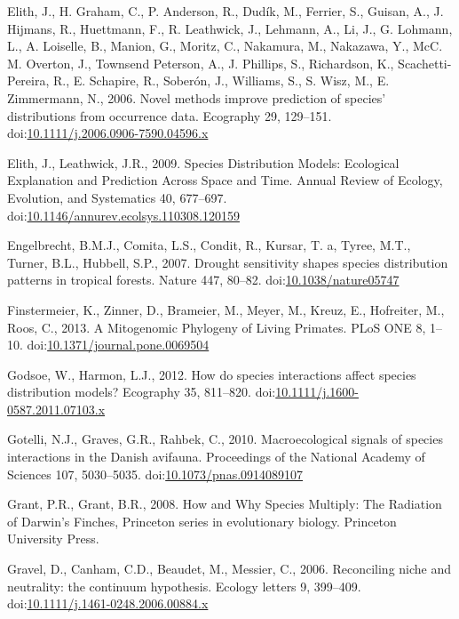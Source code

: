 \hypertarget{ref-Elith2006}{}
Elith, J., H. Graham, C., P. Anderson, R., Dudík, M., Ferrier, S.,
Guisan, A., J. Hijmans, R., Huettmann, F., R. Leathwick, J., Lehmann,
A., Li, J., G. Lohmann, L., A. Loiselle, B., Manion, G., Moritz, C.,
Nakamura, M., Nakazawa, Y., McC. M. Overton, J., Townsend Peterson, A.,
J. Phillips, S., Richardson, K., Scachetti-Pereira, R., E. Schapire, R.,
Soberón, J., Williams, S., S. Wisz, M., E. Zimmermann, N., 2006. Novel
methods improve prediction of species' distributions from occurrence
data. Ecography 29, 129--151.
doi:\href{https://doi.org/10.1111/j.2006.0906-7590.04596.x}{10.1111/j.2006.0906-7590.04596.x}

\hypertarget{ref-Elith2009a}{}
Elith, J., Leathwick, J.R., 2009. Species Distribution Models:
Ecological Explanation and Prediction Across Space and Time. Annual
Review of Ecology, Evolution, and Systematics 40, 677--697.
doi:\href{https://doi.org/10.1146/annurev.ecolsys.110308.120159}{10.1146/annurev.ecolsys.110308.120159}

\hypertarget{ref-Engelbrecht2007}{}
Engelbrecht, B.M.J., Comita, L.S., Condit, R., Kursar, T. a, Tyree,
M.T., Turner, B.L., Hubbell, S.P., 2007. Drought sensitivity shapes
species distribution patterns in tropical forests. Nature 447, 80--82.
doi:\href{https://doi.org/10.1038/nature05747}{10.1038/nature05747}

\hypertarget{ref-Finstermeier2013}{}
Finstermeier, K., Zinner, D., Brameier, M., Meyer, M., Kreuz, E.,
Hofreiter, M., Roos, C., 2013. A Mitogenomic Phylogeny of Living
Primates. PLoS ONE 8, 1--10.
doi:\href{https://doi.org/10.1371/journal.pone.0069504}{10.1371/journal.pone.0069504}

\hypertarget{ref-Godsoe2012}{}
Godsoe, W., Harmon, L.J., 2012. How do species interactions affect
species distribution models? Ecography 35, 811--820.
doi:\href{https://doi.org/10.1111/j.1600-0587.2011.07103.x}{10.1111/j.1600-0587.2011.07103.x}

\hypertarget{ref-Gotelli2010}{}
Gotelli, N.J., Graves, G.R., Rahbek, C., 2010. Macroecological signals
of species interactions in the Danish avifauna. Proceedings of the
National Academy of Sciences 107, 5030--5035.
doi:\href{https://doi.org/10.1073/pnas.0914089107}{10.1073/pnas.0914089107}

\hypertarget{ref-grant2008}{}
Grant, P.R., Grant, B.R., 2008. How and Why Species Multiply: The
Radiation of Darwin's Finches, Princeton series in evolutionary biology.
Princeton University Press.

\hypertarget{ref-Gravel2006a}{}
Gravel, D., Canham, C.D., Beaudet, M., Messier, C., 2006. Reconciling
niche and neutrality: the continuum hypothesis. Ecology letters 9,
399--409.
doi:\href{https://doi.org/10.1111/j.1461-0248.2006.00884.x}{10.1111/j.1461-0248.2006.00884.x}

